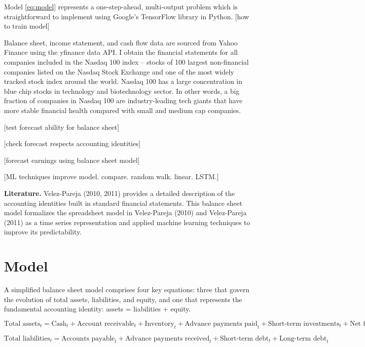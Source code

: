 \documentclass[12pt]{article}
\numberwithin{equation}{section}
\begin{document}
Model \ref{eq:model} represents a one-step-ahead, multi-output problem which is straightforward to implement using Google's TensorFlow library in Python. 
[how to train model]

Balance sheet, income statement, and cash flow data are sourced from Yahoo Finance using the yfinance data API. I obtain the financial statements for all companies included in the Nasdaq 100 index -- stocks of 100 largest non-financial companies listed on the Nasdaq Stock Exchange and one of the most widely tracked stock index around the world. Nasdaq 100 has a large concentration in blue chip stocks in technology and biotechnology sector. In other words, a big fraction of companies in Nasdaq 100 are industry-leading tech giants that have more stable financial health compared with small and medium cap companies.

[test forecast ability for balance sheet]

[check forecast respects accounting identities]

[forecast earnings using balance sheet model]

[ML techniques improve model. compare. random walk. linear. LSTM.]



\textbf{Literature.} Velez-Pareja (2010, 2011) provides a detailed description of the accounting identities built in standard financial statements. This balance sheet  model formalizes the spreadsheet model in Velez-Pareja (2010) and Velez-Pareja (2011) as a time series representation and applied machine learning techniques to improve its predictability.



\section{Model}

A simplified balance sheet model comprises four key equations: three that govern the evolution of total assets, liabilities, and equity, and one that represents the fundamental accounting identity: assets = liabilities + equity.

\begin{dmath}
	\label{eq:bs_1}
	\text{Total assets}_{t} = \text{Cash}_{t} + \text{Account receivable}_{t} + \text{Inventory}_{t} + \text{Advance payments paid}_{t} + \text{Short-term investments}_{t} + \text{Net fixed assets}_{t}
\end{dmath}

\begin{dmath}
	\label{eq:bs_2}
	\text{Total liabilities}_{t} = \text{Accounts payable}_{t} + \text{Advance payments received}_{t} + \text{Short-term debt}_{t} + \text{Long-term debt}_{t}
\end{dmath}
\end{document}
